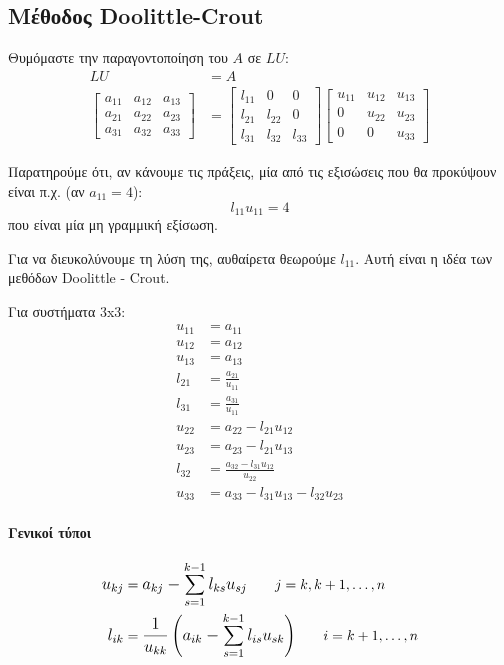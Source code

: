 \documentclass[11pt,a4paper,notitlepage,fleqn,final]{article}
\begin{document}
\subsection{Μέθοδος Doolittle-Crout}
Θυμόμαστε την παραγοντοποίηση του \( A \) σε \( LU \):
\begin{align*}
	LU &= A \\
	\left[\begin{matrix}
	a_{11} & a_{12} & a_{13} \\
	a_{21} & a_{22} & a_{23} \\
	a_{31} & a_{32} & a_{33}
	\end{matrix}\right] &= \left[\begin{matrix}
	l_{11} & 0 & 0 \\
	l_{21} & l_{22} & 0 \\
	l_{31} & l_{32} & l_{33}
	\end{matrix}\right]\left[\begin{matrix}
	u_{11} & u_{12} & u_{13} \\
	0 & u_{22} & u_{23} \\
	0 & 0 & u_{33}
	\end{matrix}\right]
\end{align*}

	Παρατηρούμε ότι, αν κάνουμε τις πράξεις, μία από τις εξισώσεις
που θα προκύψουν είναι π.χ. (αν \( a_{11} = 4 \)):
\[
l_{11}u_{11} = 4
\]
που είναι μία μη γραμμική εξίσωση.

Για να διευκολύνουμε τη λύση της, αυθαίρετα θεωρούμε \( l_{11} \).
Αυτή είναι η ιδέα των μεθόδων Doolittle - Crout.

Για συστήματα 3x3:
\begin{align*}
	u_{11} &= a_{11} \\
	u_{12} &= a_{12} \\
	u_{13} &= a_{13} \\[3ex]
	l_{21} &= \frac{a_{21}}{u_{11}} \\
	l_{31} &= \frac{a_{31}}{u_{11}} \\[3ex]
	u_{22} &= a_{22} - l_{21}u_{12} \\
	u_{23} &= a_{23} - l_{21}u_{13} \\[3ex]
	l_{32} &= \frac{a_{32}-l_{31}u_{12}}{u_{22}} \\
	u_{33} &= a_{33} - l_{31}u_{13} - l_{32}u_{23}
\end{align*}

\paragraph{Γενικοί τύποι}
\begin{align*}
	\mathlarger{u_{kj}} &=
	\mathlarger{a_{kj}-\sum_{s=1}^{k-1} l_{ks}u_{sj} }
	\qquad j=k,k+1,\dots,n \\
	\mathlarger{l_{ik}} &=
	\mathlarger{
	\frac{1}{u_{kk}} \left(a_{ik}-\sum_{s=1}^{k-1}
	l_{is}u_{sk}\right)
    }\qquad i=k+1,\dots,n
\end{align*}
\end{document}
